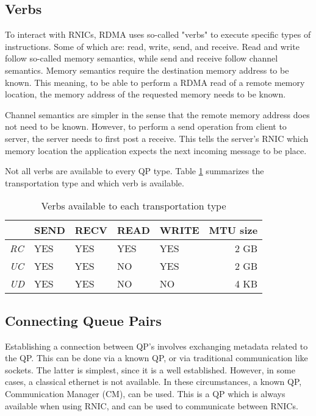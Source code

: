 \subsection{Verbs}\label{subsec:verbs}
To interact with RNICs, RDMA uses so-called "verbs" to execute specific types of instructions.
Some of which are: read, write, send, and receive.
Read and write follow so-called memory semantics, while send and receive follow channel semantics.
Memory semantics require the destination memory address to be known.
This meaning, to be able to perform a RDMA read of a remote memory location, the memory address of the requested memory needs to be known.

Channel semantics are simpler in the sense that the remote memory address does not need to be known.
However, to perform a send operation from client to server, the server needs to first post a receive.
This tells the server's RNIC which memory location the application expects the next incoming message to be place.

Not all verbs are available to every QP type. Table \ref{tab:transport-verb} summarizes the transportation type and which verb is available.

\begin{table}
    \centering
    \begin{tabular}{lllllr}
        \toprule
          & \textbf{SEND} & \textbf{RECV} & \textbf{READ} & \textbf{WRITE} & \textbf{MTU size} \\
        \midrule
        \textit{RC} & YES & YES & YES & YES & 2 GB \\
        \textit{UC} & YES & YES & NO & YES & 2 GB \\
        \textit{UD} & YES & YES & NO & NO & 4 KB \\
        \bottomrule
    \end{tabular}
    \caption{Verbs available to each transportation type}
    \label{tab:transport-verb}
\end{table}

\subsection{Connecting Queue Pairs}\label{subsec:connecting-qp's}
Establishing a connection between QP's involves exchanging metadata related to the QP.
This can be done via a known QP, or via traditional communication like sockets.
The latter is simplest, since it is a well established.
However, in some cases, a classical ethernet is not available.
In these circumstances, a known QP, Communication Manager (CM), can be used.
This is a QP which is always available when using RNIC, and can be used to communicate between RNICs.

